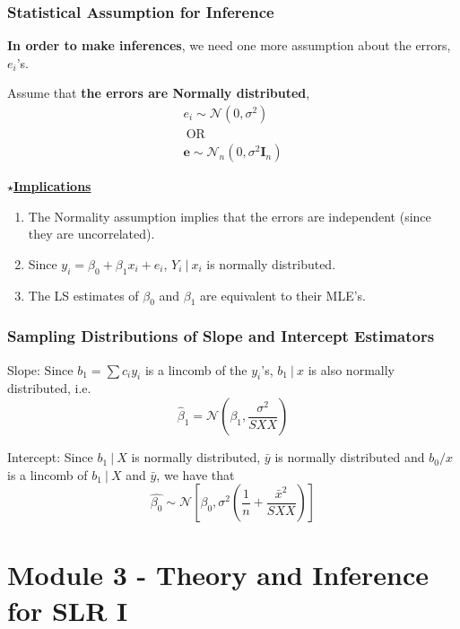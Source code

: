 \documentclass[11pt]{article}
\newcommand\op[1]{{\ \mathrm{#1}\ }}
\newcommand\OR{{\op{OR}}}
\newcommand\VEC{\bm}{}
\theoremstyle{definition}
\numberwithin{equation}{section}
\begin{document}
\subsubsection{Statistical Assumption for Inference}

\textbf{In order to make inferences}, we need one more assumption about the errors, $e_i$'s.

Assume that \textbf{the errors are Normally distributed},
\begin{gather*}
e_i\sim \mathcal{N}(0,\sigma^2)\\
\OR\\
  \VEC{e}\sim\mathcal{N}_n(0,\sigma^2\VEC{I}_n)
\end{gather*}

$\star$\textbf{\underline{Implications}}
\begin{enumerate}
  \item The Normality assumption implies that the errors are independent (since they are uncorrelated).
  \item Since $y_i = \beta_0 + \beta_1x_i + e_i$, $Y_i\>|\>x_i$ is normally distributed.
  \item The LS estimates of $\beta_0$ and $\beta_1$ are equivalent to their MLE's.
\end{enumerate}

\subsubsection{Sampling Distributions of Slope and Intercept Estimators}

Slope: Since $b_1=\sum c_iy_i$ is a lincomb of the $y_i$'s, $b_1\>|\>x$ is also normally distributed, i.e. 
\begin{equation}
  \hat{\beta}_1 = \mathcal{N}\left( \beta_1,\frac{\sigma^2}{SXX} \right)
\end{equation}

Intercept: Since $b_1\>|\> X$ is normally distributed, $\bar{y}$ is normally distributed and $b_0/x$ is a lincomb of $b_1\>|\>X$ and $\bar{y}$, we have that
\begin{equation}
  \hat{\beta_0}\sim\mathcal{N}\left[ \beta_0, \sigma^2\left( \frac{1}{n} + \frac{\bar{x}^2}{SXX} \right) \right]
\end{equation}

\newpage
\section{Module 3 - Theory and Inference for SLR I}
\end{document}
